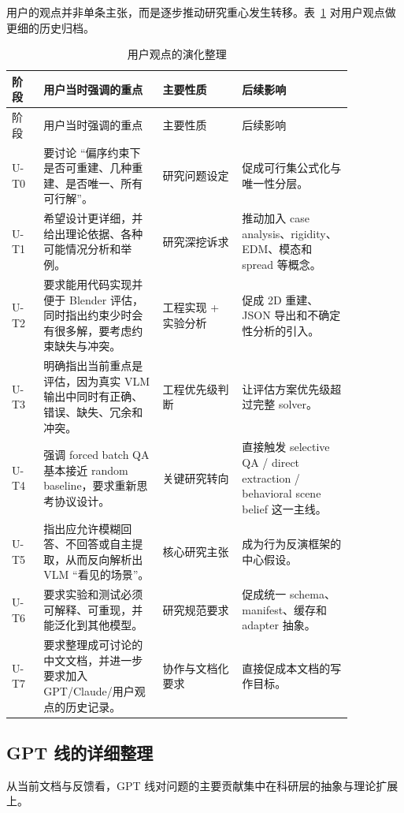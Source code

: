 \documentclass[11pt,a4paper]{ctexart}
\begin{document}
用户的观点并非单条主张，而是逐步推动研究重心发生转移。表~\ref{tab:user-evolution} 对用户观点做更细的历史归档。

\begin{longtable}{p{0.08\linewidth}p{0.30\linewidth}p{0.20\linewidth}p{0.28\linewidth}}
\caption{用户观点的演化整理}\label{tab:user-evolution}\\
\toprule
阶段 & 用户当时强调的重点 & 主要性质 & 后续影响 \\
\midrule
\endfirsthead
\toprule
阶段 & 用户当时强调的重点 & 主要性质 & 后续影响 \\
\midrule
\endhead
U-T0 & 要讨论 ``偏序约束下是否可重建、几种重建、是否唯一、所有可行解''。 & 研究问题设定 & 促成可行集公式化与唯一性分层。 \\
U-T1 & 希望设计更详细，并给出理论依据、各种可能情况分析和举例。 & 研究深挖诉求 & 推动加入 case analysis、rigidity、EDM、模态和 spread 等概念。 \\
U-T2 & 要求能用代码实现并便于 Blender 评估，同时指出约束少时会有很多解，要考虑约束缺失与冲突。 & 工程实现 + 实验分析 & 促成 2D 重建、JSON 导出和不确定性分析的引入。 \\
U-T3 & 明确指出当前重点是评估，因为真实 VLM 输出中同时有正确、错误、缺失、冗余和冲突。 & 工程优先级判断 & 让评估方案优先级超过完整 solver。 \\
U-T4 & 强调 forced batch QA 基本接近 random baseline，要求重新思考协议设计。 & 关键研究转向 & 直接触发 selective QA / direct extraction / behavioral scene belief 这一主线。 \\
U-T5 & 指出应允许模糊回答、不回答或自主提取，从而反向解析出 VLM ``看见的场景''。 & 核心研究主张 & 成为行为反演框架的中心假设。 \\
U-T6 & 要求实验和测试必须可解释、可重现，并能泛化到其他模型。 & 研究规范要求 & 促成统一 schema、manifest、缓存和 adapter 抽象。 \\
U-T7 & 要求整理成可讨论的中文文档，并进一步要求加入 GPT/Claude/用户观点的历史记录。 & 协作与文档化要求 & 直接促成本文档的写作目标。 \\
\bottomrule
\end{longtable}

\subsection{GPT 线的详细整理}

从当前文档与反馈看，GPT 线对问题的主要贡献集中在科研层的抽象与理论扩展上。
\end{document}
